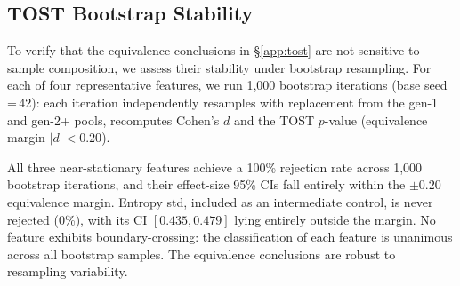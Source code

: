 \subsection{TOST Bootstrap Stability}\label{app:tost-bootstrap}

To verify that the equivalence conclusions in \S\ref{app:tost} are not sensitive to sample composition, we assess their stability under bootstrap resampling.
For each of four representative features, we run 1{,}000 bootstrap iterations (base seed\,=\,42): each iteration independently resamples with replacement from the gen-1 and gen-2+ pools, recomputes Cohen's $d$ and the TOST $p$-value (equivalence margin $|d| < 0.20$).

\begin{table}[ht]
\centering
\footnotesize
\caption{Bootstrap stability of TOST equivalence ($B{=}1{,}000$, margin $|d|{<}0.20$). Rejection rate = fraction of bootstrap iterations where TOST rejects non-equivalence at $\alpha{=}0.05$.}
\label{tab:tost-bootstrap}
\end{table}

All three near-stationary features achieve a 100\% rejection rate across 1{,}000 bootstrap iterations, and their effect-size 95\% CIs fall entirely within the $\pm 0.20$ equivalence margin.
Entropy std, included as an intermediate control, is never rejected (0\%), with its CI $[0.435, 0.479]$ lying entirely outside the margin.
No feature exhibits boundary-crossing: the classification of each feature is unanimous across all bootstrap samples. The equivalence conclusions are robust to resampling variability.

